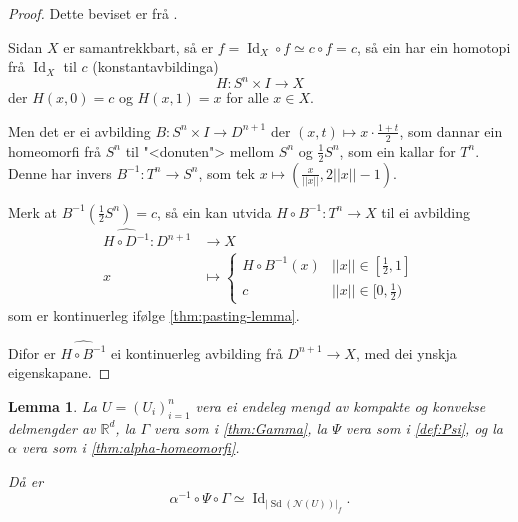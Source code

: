 \documentclass[a4paper, 12pt, norsk]{article}
\theoremstyle{plain}
\newtheorem{lemma}[theorem]{Lemma}
\theoremstyle{definition}
\newcommand{\Rb}{\mathbb{R}}
\newcommand{\Nc}{\mathcal{N}}
\newcommand{\gr}[1]{ \lvert #1 \rvert } %
\newcommand{\tuple}[1]{ \left( #1 \right) } %
\DeclareMathOperator{\Sd}{Sd} %
\DeclareMathOperator{\Id}{Id} %
\begin{document}
\begin{proof}
	Dette beviset er frå \cite[s. 319--320]{MR3932132}.

	Sidan \( X \) er samantrekkbart, så er \( f = \Id_X \circ f \simeq c \circ f = c \), så ein har ein homotopi frå \( \Id_X \) til \( c \) (konstantavbildinga)
	\[
		H: S^n \times I \to X
	\]
	der \( H(x, 0) = c \) og \( H(x, 1) = x \) for alle \( x \in X \).

	Men det er ei avbilding \( B: S^n \times I \to D^{n+1} \) der \( (x,t) \mapsto x\cdot\frac{1+t}{2} \), som dannar ein homeomorfi frå \( S^n \) til "<donuten"> mellom \( S^n \) og \( \frac{1}{2}S^n \), som ein kallar for \( T^n \). Denne har invers \( B^{-1}: T^n \to S^n \), som tek \( x \mapsto \tuple{\frac{x}{||x||}, 2||x||-1} \).
	
	Merk at \( B^{-1}\tuple{\frac{1}{2}S^n}= c \), så ein kan utvida \( H \circ B^{-1}: T^n \to X \) til ei avbilding
	\begin{align*}
		\widehat{H \circ D^{-1}} : D^{n+1} &\to X \\
		x &\mapsto
		\begin{cases}
			H \circ B^{-1}(x) & ||x|| \in [\frac{1}{2}, 1] \\
			c & ||x|| \in [0, \frac{1}{2})
		\end{cases}
	\end{align*}
	som er kontinuerleg ifølge \autoref{thm:pasting-lemma}.

	Difor er \( \widehat{H \circ B^{-1}} \) ei kontinuerleg avbilding frå \( D^{n+1} \to X \), med dei ynskja eigenskapane.
\end{proof}

\begin{lemma} \label{thm:homeq-sd}
	La \( U = \tuple{U_i}_{i=1}^n \) vera ei endeleg mengd av kompakte og konvekse delmengder av \( \Rb^d \), la \( \Gamma \) vera som i \autoref{thm:Gamma}, la \( \Psi \) vera som i \autoref{def:Psi}, og la \( \alpha \) vera som i \autoref{thm:alpha-homeomorfi}. 
	
	Då er
	\[
		\alpha^{-1} \circ \Psi \circ \Gamma \simeq \Id_{\gr{\Sd(\Nc(U))}_f}.
	\]
\end{lemma}
\end{document}
